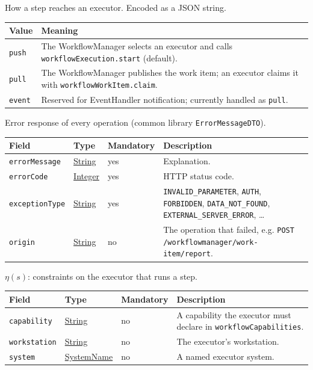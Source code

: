 \documentclass[a4paper]{arrowhead}
\newcommand{\pref}[1]{{\textcolor{ArrowheadGrey}{\hyperref[sec:model:primitives:#1]{#1}}}}
\begin{document}
How a step reaches an executor.
 Encoded as a JSON string.
{\small
\begin{longtable}{|p{3.9cm}|p{11.9cm}|}

\hline
\rowcolor{gray!33} Value & Meaning \\ \hline
\endhead
\texttt{push} & The WorkflowManager selects an executor and calls \texttt{workflowExecution.start} (default). \\ \hline
\texttt{pull} & The WorkflowManager publishes the work item; an executor claims it with \texttt{workflowWorkItem.claim}. \\ \hline
\texttt{event} & Reserved for EventHandler notification; currently handled as \texttt{pull}. \\ \hline
\end{longtable}
}

Error response of every operation (common library \texttt{ErrorMessageDTO}).

{\small
\begin{longtable}{|p{3.7cm}|p{4.2cm}|p{1.6cm}|p{6.3cm}|}

\hline
\rowcolor{gray!33} Field & Type & Mandatory & Description \\ \hline
\endhead
\texttt{errorMessage} & \pref{String} & yes & Explanation. \\ \hline
\texttt{errorCode} & \pref{Integer} & yes & HTTP status code. \\ \hline
\texttt{exceptionType} & \pref{String} & yes & \texttt{INVALID\_PARAMETER}, \texttt{AUTH}, \texttt{FORBIDDEN}, \texttt{DATA\_NOT\_FOUND}, \texttt{EXTERNAL\_SERVER\_ERROR}, \ldots \\ \hline
\texttt{origin} & \pref{String} & no & The operation that failed, e.g. \texttt{POST /workflowmanager/work-item/report}. \\ \hline
\end{longtable}
}

$\eta(s)$: constraints on the executor that runs a step.

{\small
\begin{longtable}{|p{3.7cm}|p{4.2cm}|p{1.6cm}|p{6.3cm}|}

\hline
\rowcolor{gray!33} Field & Type & Mandatory & Description \\ \hline
\endhead
\texttt{capability} & \pref{String} & no & A capability the executor must declare in \texttt{workflowCapabilities}. \\ \hline
\texttt{workstation} & \pref{String} & no & The executor's workstation. \\ \hline
\texttt{system} & \pref{SystemName} & no & A named executor system. \\ \hline
\end{longtable}
}
\end{document}
